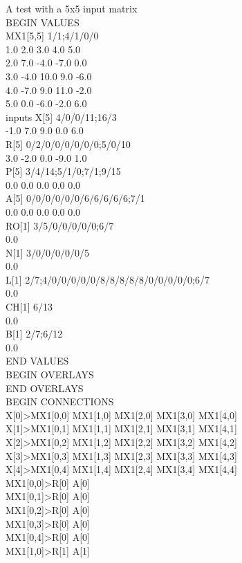 \documentclass[12pt,a4paper]{article}
\begin{document}
A test with a 5x5 input matrix\\
BEGIN VALUES\\
MX1[5,5] 1/1;4/1/0/0\\
1.0 2.0 3.0 4.0 5.0\\
2.0 7.0 -4.0 -7.0 0.0\\
3.0 -4.0 10.0 9.0 -6.0\\
4.0 -7.0 9.0 11.0 -2.0\\
5.0 0.0 -6.0 -2.0 6.0\\ inputs
X[5] 4/0/0/11;16/3\\
-1.0 7.0 9.0 0.0 6.0\\
R[5] 0/2/0/0/0/0/0/0;5/0/10\\
3.0 -2.0 0.0 -9.0 1.0\\
P[5] 3/4/14;5/1/0;7/1;9/15\\
0.0 0.0 0.0 0.0 0.0\\
A[5] 0/0/0/0/0/0/6/6/6/6/6;7/1\\
0.0 0.0 0.0 0.0 0.0\\
RO[1] 3/5/0/0/0/0/0;6/7\\
0.0\\
N[1] 3/0/0/0/0/0/5\\
0.0\\
L[1] 2/7;4/0/0/0/0/0/8/8/8/8/8/0/0/0/0/0;6/7\\
0.0\\
CH[1] 6/13\\
0.0\\
B[1] 2/7;6/12\\
0.0\\
END VALUES\\
BEGIN OVERLAYS\\
END OVERLAYS\\
BEGIN CONNECTIONS\\
X[0]>MX1[0,0] MX1[1,0] MX1[2,0] MX1[3,0] MX1[4,0]\\
X[1]>MX1[0,1] MX1[1,1] MX1[2,1] MX1[3,1] MX1[4,1]\\
X[2]>MX1[0,2] MX1[1,2] MX1[2,2] MX1[3,2] MX1[4,2]\\
X[3]>MX1[0,3] MX1[1,3] MX1[2,3] MX1[3,3] MX1[4,3]\\
X[4]>MX1[0,4] MX1[1,4] MX1[2,4] MX1[3,4] MX1[4,4]\\
MX1[0,0]>R[0] A[0]\\
MX1[0,1]>R[0] A[0]\\
MX1[0,2]>R[0] A[0]\\
MX1[0,3]>R[0] A[0]\\
MX1[0,4]>R[0] A[0]\\
MX1[1,0]>R[1] A[1]\\
\end{document}

